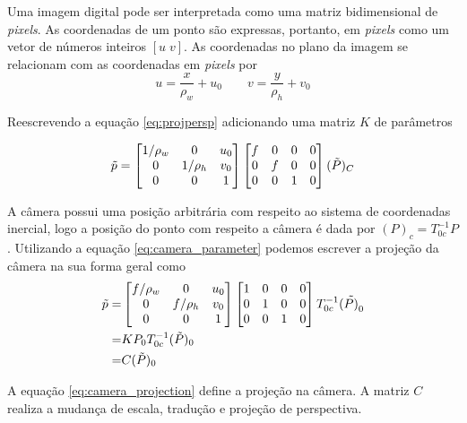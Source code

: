 Uma imagem digital pode ser interpretada como uma matriz bidimensional de \textit{pixels}. As coordenadas de um ponto são expressas, portanto, em \textit{pixels} como um vetor de números inteiros $[u\; v]$. As coordenadas no plano da imagem se relacionam com as coordenadas em \textit{pixels} por
\begin{equation}
u =  \frac{x}{\rho_w} + u_0 \qquad v = \frac{y}{\rho_h} + v_0
\end{equation}

Reescrevendo a equação \eqref{eq:projpersp} adicionando uma matriz ${K}$ de parâmetros

\begin{equation} \label{eq:camera_parameter}
{\tilde{p}} = 
\begin{bmatrix}
	1/\rho_w & 0 & u_0 \\
	0        & 1/\rho_h &v_0 \\
	0 & 0 & 1 \\
\end{bmatrix}
\begin{bmatrix} f & 0 & 0 & 0\\
	 0 & f & 0 & 0\\
	 0 & 0 & 1 & 0	
\end{bmatrix}
(\tilde{{P}})_C
\end{equation}

A câmera possui uma posição arbitrária com respeito ao sistema de coordenadas inercial, logo a posição do ponto com respeito a câmera é dada por  $({P})_c = {T}_{0c}^{-1} {P}$. Utilizando a equação \eqref{eq:camera_parameter} podemos escrever a projeção da câmera na sua forma geral como
\begin{align}\label{eq:camera_projection}
{\tilde{p}} =& 
\begin{bmatrix}
	f/\rho_w & 0 & u_0 \\
	0        & f/\rho_h &v_0 \\
	0 & 0 & 1 \\
\end{bmatrix}
\begin{bmatrix}  1 & 0 & 0 & 0\\
	 0 & 1 & 0 & 0\\
	 0 & 0 & 1 & 0	
\end{bmatrix}
{T}_{0c}^{-1} (\tilde{{P})}_0\\
=& {K} {P}_0 {T}_{0c}^{-1} (\tilde{{P}})_0 \\ 
=& {C} ({\tilde{P})_0}
\end{align}

A equação \eqref{eq:camera_projection} define a projeção na câmera. A matriz $C$ realiza a mudança de escala, tradução e projeção de perspectiva. 


